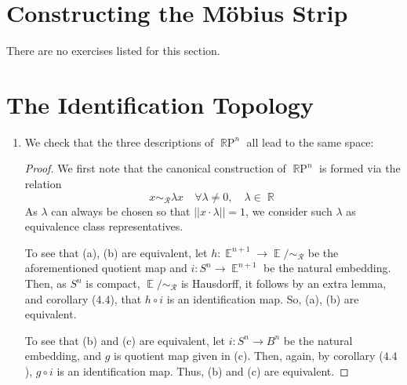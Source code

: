 \documentclass{book}
\DeclareMathOperator*{\R}{\mathbb{R}}
\DeclareMathOperator*{\E}{\mathbb{E}}
\DeclareMathOperator*{\RP}{\R\text{P}}
\begin{document}
\section{Constructing the M\"obius Strip}
There are no exercises listed for this section. 

\section{The Identification Topology}
\begin{enumerate}[(1)]
    \item  We check that the three descriptions of ${\RP}^n$ all lead to the same space: 
        \begin{proof} We first note that the canonical construction of $\RP^n$ is formed via the relation 
            \[ x \sim_\mathcal{R} \lambda x \quad \forall \lambda \neq 0, \quad \lambda \in \R\]
            As $\lambda$ can always be chosen so that $||x \cdot \lambda || = 1$, we consider such $\lambda$ as equivalence class representatives. 
            \par To see that (a), (b) are equivalent, let $h: \E^{n+1} \rightarrow \E / \sim_{\mathcal{R}}$ be the aforementioned quotient map and $i: S^n \rightarrow \E^{n+1}$ be the natural embedding. Then, as $S^n$ is compact, $\E / \sim_{\mathcal{R}}$ is Hausdorff, it follows by an extra lemma, and corollary ($4.4$), that $h \circ i$ is an identification map. So, (a), (b) are equivalent. 
            \par To see that (b) and (c) are equivalent, let $i: S^n \rightarrow B^n$ be the natural embedding, and $g$ is quotient map given in (c). Then, again, by corollary ($4.4$), $g \circ i$ is an identification map. Thus, (b) and (c) are equivalent. 
        \end{proof}


\end{enumerate}
\end{document}
